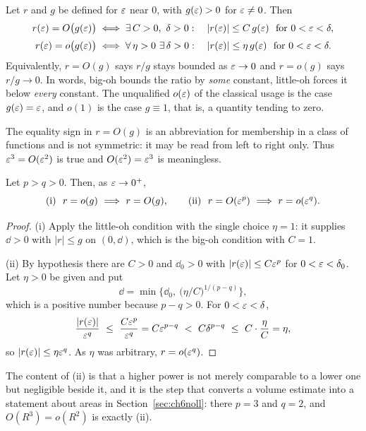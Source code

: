 \begin{definition}\label{def:landau}
Let $r$ and $g$ be defined for $\varepsilon$ near $0$, with $g(\varepsilon)>0$ for
$\varepsilon\neq0$. Then
\[
\begin{aligned}
   r(\varepsilon)=O\big(g(\varepsilon)\big)
   &\iff \exists\,C>0,\ \delta>0:\quad
     |r(\varepsilon)|\le C\,g(\varepsilon)\ \ \text{for }0<\varepsilon<\delta ,\\[2pt]
   r(\varepsilon)=o\big(g(\varepsilon)\big)
   &\iff \forall\,\eta>0\ \exists\,\delta>0:\quad
     |r(\varepsilon)|\le \eta\,g(\varepsilon)\ \ \text{for }0<\varepsilon<\delta .
\end{aligned}
\]
Equivalently, $r=O(g)$ says $r/g$ stays bounded as $\varepsilon\to0$ and
$r=o(g)$ says $r/g\to0$. In words, big-oh bounds the ratio by
\emph{some} constant, little-oh forces it below \emph{every} constant.
The unqualified $o(\varepsilon)$ of the classical usage is the case
$g(\varepsilon)=\varepsilon$, and $o(1)$ is the case $g\equiv1$, that is, a quantity
tending to zero.

The equality sign in $r=O(g)$ is an abbreviation for membership in a
class of functions and is not symmetric: it may be read from left to
right only. Thus $\varepsilon^{3}=O(\varepsilon^{2})$ is true and
$O(\varepsilon^{2})=\varepsilon^{3}$ is meaningless.
\end{definition}

\begin{lemma}\label{lem:landau}
Let $p>q>0$. Then, as $\varepsilon\to0^{+}$,
\[
   \text{\textup{(i)}}\ \ r=o(g)\ \Longrightarrow\ r=O(g),
   \qquad
   \text{\textup{(ii)}}\ \ r=O(\eps^{p})\ \Longrightarrow\ r=o(\eps^{q}).
\]
\end{lemma}

\begin{proof}
\textup{(i)} Apply the little-oh condition with the single choice
$\eta=1$: it supplies $\dd>0$ with $|r|\le g$ on $(0,\dd)$, which is the
big-oh condition with $C=1$.

\textup{(ii)} By hypothesis there are $C>0$ and $\dd_{0}>0$ with
$|r(\varepsilon)|\le C\varepsilon^{p}$ for $0<\varepsilon<\delta_{0}$. Let $\eta>0$ be given and
put
\[
   \dd=\min\Big\{\dd_{0},\ \big(\eta/C\big)^{1/(p-q)}\Big\},
\]
which is a positive number because $p-q>0$. For $0<\varepsilon<\delta$,
\[
   \frac{|r(\eps)|}{\eps^{q}}\ \le\ \frac{C\eps^{p}}{\eps^{q}}
   =C\eps^{p-q}\ <\ C\dd^{p-q}\ \le\ C\cdot\frac{\eta}{C}=\eta ,
\]
so $|r(\varepsilon)|\le\eta\varepsilon^{q}$. As $\eta$ was arbitrary, $r=o(\varepsilon^{q})$.
\end{proof}

The content of (ii) is that a higher power is not merely comparable to a
lower one but negligible beside it, and it is the step that converts a
volume estimate into a statement about areas in
Section~\ref{sec:ch6noll}: there $p=3$ and $q=2$, and
$O(R^{3})=o(R^{2})$ is exactly \textup{(ii)}.

